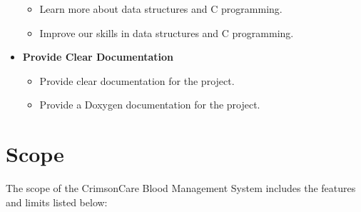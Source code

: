 \documentclass[12pt,a4paper]{report}
\begin{document}
\begin{itemize}
    \begin{itemize}
        \item Learn more about data structures and C programming.
        \item Improve our skills in data structures and C programming.
    \end{itemize}
    \item \normalsize \textbf{Provide Clear Documentation}
    \begin{itemize}
        \item Provide clear documentation for the project.
        \item Provide a Doxygen documentation for the project.
    \end{itemize}
\end{itemize}

\section{Scope}
The scope of the CrimsonCare Blood Management System includes the features and limits listed below:
\end{document}
